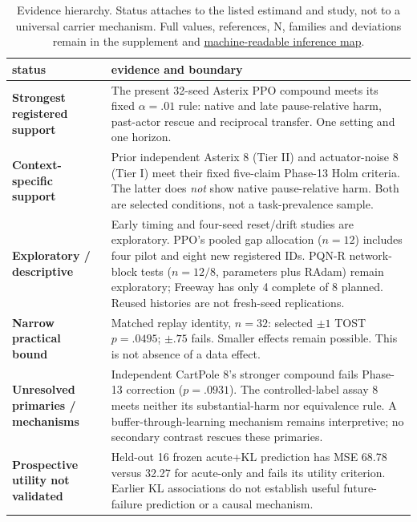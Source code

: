 \documentclass[10pt]{article}
\newcommand{\artifact}[2]{\href{https://github.com/Nityahapani/rlearlydamage/blob/main/#1}{#2}}
\begin{document}
\begin{table}[ht]
\centering
\caption{Evidence hierarchy. Status attaches to the listed estimand and study, not to a universal carrier mechanism. Full values, references, N, families and deviations remain in the supplement and \artifact{docs/headline_inference_map.json}{machine-readable inference map}.}
\label{m:hierarchy}
\small
\begin{tabularx}{\linewidth}{@{}>{\raggedright\arraybackslash}p{3.0cm}X@{}}
\toprule
status & evidence and boundary \\
\midrule
\textbf{Strongest registered support} & The present 32-seed Asterix PPO compound meets its fixed $\alpha=.01$ rule: native and late pause-relative harm, past-actor rescue and reciprocal transfer. One setting and one horizon. \\
\addlinespace
\textbf{Context-specific support} & Prior independent Asterix 8 (Tier II) and actuator-noise 8 (Tier I) meet their fixed five-claim Phase-13 Holm criteria. The latter does \emph{not} show native pause-relative harm. Both are selected conditions, not a task-prevalence sample. \\
\addlinespace
\textbf{Exploratory / descriptive} & Early timing and four-seed reset/drift studies are exploratory. PPO's pooled gap allocation ($n=12$) includes four pilot and eight new registered IDs. PQN-R network-block tests ($n=12/8$, parameters plus RAdam) remain exploratory; Freeway has only 4 complete of 8 planned. Reused histories are not fresh-seed replications. \\
\addlinespace
\textbf{Narrow practical bound} & Matched replay identity, $n=32$: selected $\pm1$ TOST $p=.0495$; $\pm.75$ fails. Smaller effects remain possible. This is not absence of a data effect. \\
\addlinespace
\textbf{Unresolved primaries / mechanisms} & Independent CartPole 8's stronger compound fails Phase-13 correction ($p=.0931$). The controlled-label assay 8 meets neither its substantial-harm nor equivalence rule. A buffer-through-learning mechanism remains interpretive; no secondary contrast rescues these primaries. \\
\addlinespace
\textbf{Prospective utility not validated} & Held-out 16 frozen acute+KL prediction has MSE 68.78 versus 32.27 for acute-only and fails its utility criterion. Earlier KL associations do not establish useful future-failure prediction or a causal mechanism. \\
\bottomrule
\end{tabularx}
\end{table}
\end{document}
